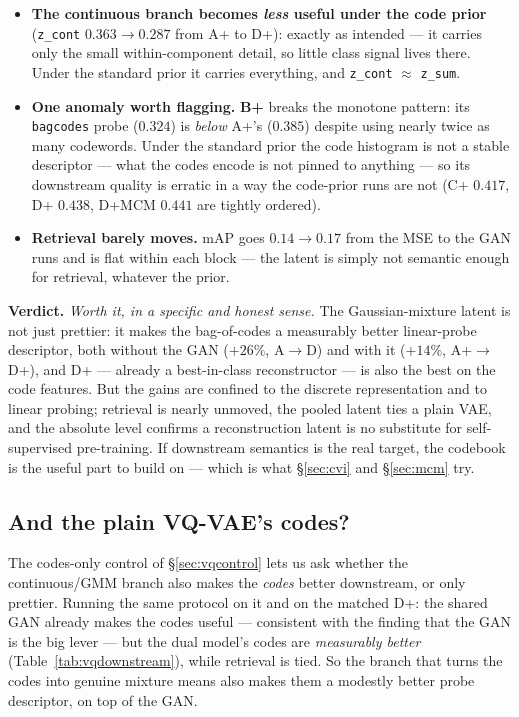\documentclass[11pt]{article}
\begin{document}
\begin{itemize}
  \item \textbf{The continuous branch becomes \emph{less} useful under the code prior}
  (\texttt{z\_cont} $0.363\!\to\!0.287$ from A+ to D+): exactly as intended --- it carries only the
  small within-component detail, so little class signal lives there. Under the standard prior it
  carries everything, and \texttt{z\_cont} $\approx$ \texttt{z\_sum}.
  \item \textbf{One anomaly worth flagging.} \textbf{B+} breaks the monotone pattern: its
  \texttt{bagcodes} probe ($0.324$) is \emph{below} A+'s ($0.385$) despite using nearly twice as
  many codewords. Under the standard prior the code histogram is not a stable descriptor --- what
  the codes encode is not pinned to anything --- so its downstream quality is erratic in a way the
  code-prior runs are not (C+ $0.417$, D+ $0.438$, D+MCM $0.441$ are tightly ordered).
  \item \textbf{Retrieval barely moves.} mAP goes $0.14 \to 0.17$ from the MSE to the GAN runs and
  is flat within each block --- the latent is simply not semantic enough for retrieval, whatever
  the prior.
\end{itemize}
\textbf{Verdict.} \emph{Worth it, in a specific and honest sense.} The Gaussian-mixture latent
is not just prettier: it makes the bag-of-codes a measurably better linear-probe descriptor, both
without the GAN ($+26\%$, A$\to$D) and with it ($+14\%$, A+$\to$D+), and D+ --- already a
best-in-class reconstructor --- is also the best on the code features. But the gains are confined
to the discrete representation and to linear probing; retrieval is nearly unmoved, the pooled latent
ties a plain VAE, and the absolute level confirms a reconstruction latent is no substitute for
self-supervised pre-training. If downstream semantics is the real target, the codebook is the useful
part to build on --- which is what \S\ref{sec:cvi} and \S\ref{sec:mcm} try.

\subsection*{And the plain VQ-VAE's codes?}
The codes-only control of \S\ref{sec:vqcontrol} lets us ask whether the continuous/GMM branch also
makes the \emph{codes} better downstream, or only prettier. Running the same protocol on it and on
the matched D+: the shared GAN already makes the codes useful --- consistent with the finding that
the GAN is the big lever --- but the dual model's codes are \emph{measurably better}
(Table~\ref{tab:vqdownstream}), while retrieval is tied. So the branch that turns the codes into
genuine mixture means also makes them a modestly better probe descriptor, on top of the GAN.
\end{document}
